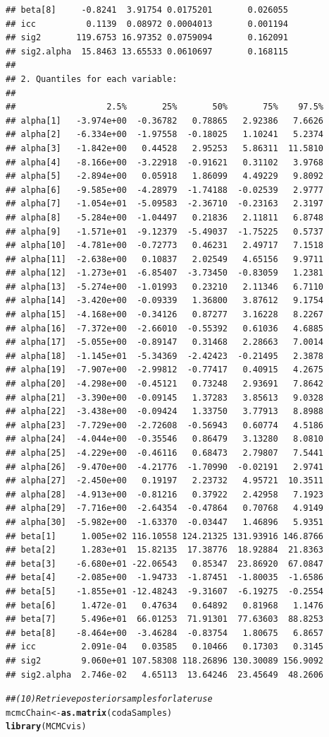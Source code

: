 \documentclass{article}\usepackage[]{graphicx}\usepackage[]{color}
\makeatletter
\newcommand{\hlcom}[1]{\textcolor[rgb]{0.678,0.584,0.686}{\textit{#1}}}%
\newcommand{\hlstd}[1]{\textcolor[rgb]{0.345,0.345,0.345}{#1}}%
\newcommand{\hlkwb}[1]{\textcolor[rgb]{0.69,0.353,0.396}{#1}}%
\newcommand{\hlkwd}[1]{\textcolor[rgb]{0.737,0.353,0.396}{\textbf{#1}}}%
\newenvironment{kframe}{%
 \def\at@end@of@kframe{}%
 \ifinner\ifhmode%
  \def\at@end@of@kframe{\end{minipage}}%
  \begin{minipage}{\columnwidth}%
 \fi\fi%
 \def\FrameCommand##1{\hskip\@totalleftmargin \hskip-\fboxsep
 \colorbox{shadecolor}{##1}\hskip-\fboxsep
     \hskip-\linewidth \hskip-\@totalleftmargin \hskip\columnwidth}%
 \MakeFramed {\advance\hsize-\width
   \@totalleftmargin\z@ \linewidth\hsize
   \@setminipage}}%
 {\par\unskip\endMakeFramed%
 \at@end@of@kframe}
\newenvironment{knitrout}{}{} %
\makeatother
\begin{document}
\begin{knitrout}
\begin{kframe}
\begin{verbatim}
## beta[8]     -0.8241  3.91754 0.0175201       0.026055
## icc          0.1139  0.08972 0.0004013       0.001194
## sig2       119.6753 16.97352 0.0759094       0.162091
## sig2.alpha  15.8463 13.65533 0.0610697       0.168115
## 
## 2. Quantiles for each variable:
## 
##                  2.5%       25%       50%       75%    97.5%
## alpha[1]   -3.974e+00  -0.36782   0.78865   2.92386   7.6626
## alpha[2]   -6.334e+00  -1.97558  -0.18025   1.10241   5.2374
## alpha[3]   -1.842e+00   0.44528   2.95253   5.86311  11.5810
## alpha[4]   -8.166e+00  -3.22918  -0.91621   0.31102   3.9768
## alpha[5]   -2.894e+00   0.05918   1.86099   4.49229   9.8092
## alpha[6]   -9.585e+00  -4.28979  -1.74188  -0.02539   2.9777
## alpha[7]   -1.054e+01  -5.09583  -2.36710  -0.23163   2.3197
## alpha[8]   -5.284e+00  -1.04497   0.21836   2.11811   6.8748
## alpha[9]   -1.571e+01  -9.12379  -5.49037  -1.75225   0.5737
## alpha[10]  -4.781e+00  -0.72773   0.46231   2.49717   7.1518
## alpha[11]  -2.638e+00   0.10837   2.02549   4.65156   9.9711
## alpha[12]  -1.273e+01  -6.85407  -3.73450  -0.83059   1.2381
## alpha[13]  -5.274e+00  -1.01993   0.23210   2.11346   6.7110
## alpha[14]  -3.420e+00  -0.09339   1.36800   3.87612   9.1754
## alpha[15]  -4.168e+00  -0.34126   0.87277   3.16228   8.2267
## alpha[16]  -7.372e+00  -2.66010  -0.55392   0.61036   4.6885
## alpha[17]  -5.055e+00  -0.89147   0.31468   2.28663   7.0014
## alpha[18]  -1.145e+01  -5.34369  -2.42423  -0.21495   2.3878
## alpha[19]  -7.907e+00  -2.99812  -0.77417   0.40915   4.2675
## alpha[20]  -4.298e+00  -0.45121   0.73248   2.93691   7.8642
## alpha[21]  -3.390e+00  -0.09145   1.37283   3.85613   9.0328
## alpha[22]  -3.438e+00  -0.09424   1.33750   3.77913   8.8988
## alpha[23]  -7.729e+00  -2.72608  -0.56943   0.60774   4.5186
## alpha[24]  -4.044e+00  -0.35546   0.86479   3.13280   8.0810
## alpha[25]  -4.229e+00  -0.46116   0.68473   2.79807   7.5441
## alpha[26]  -9.470e+00  -4.21776  -1.70990  -0.02191   2.9741
## alpha[27]  -2.450e+00   0.19197   2.23732   4.95721  10.3511
## alpha[28]  -4.913e+00  -0.81216   0.37922   2.42958   7.1923
## alpha[29]  -7.716e+00  -2.64354  -0.47864   0.70768   4.9149
## alpha[30]  -5.982e+00  -1.63370  -0.03447   1.46896   5.9351
## beta[1]     1.005e+02 116.10558 124.21325 131.93916 146.8766
## beta[2]     1.283e+01  15.82135  17.38776  18.92884  21.8363
## beta[3]    -6.680e+01 -22.06543   0.85347  23.86920  67.0847
## beta[4]    -2.085e+00  -1.94733  -1.87451  -1.80035  -1.6586
## beta[5]    -1.855e+01 -12.48243  -9.31607  -6.19275  -0.2554
## beta[6]     1.472e-01   0.47634   0.64892   0.81968   1.1476
## beta[7]     5.496e+01  66.01253  71.91301  77.63603  88.8253
## beta[8]    -8.464e+00  -3.46284  -0.83754   1.80675   6.8657
## icc         2.091e-04   0.03585   0.10466   0.17303   0.3145
## sig2        9.060e+01 107.58308 118.26896 130.30089 156.9092
## sig2.alpha  2.746e-02   4.65113  13.64246  23.45649  48.2606
\end{verbatim}
\begin{alltt}
\hlcom{## (10) Retrieve posterior samples for later use}
\hlstd{mcmcChain} \hlkwb{<-} \hlkwd{as.matrix}\hlstd{(codaSamples)}
\hlkwd{library}\hlstd{(MCMCvis)}



\end{alltt}
\end{kframe}
\end{knitrout}
\end{document}
